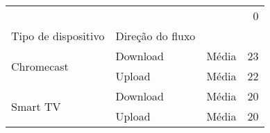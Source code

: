 \begin{tabular}{lllr}
\toprule
 &  &  & 0 \\
Tipo de dispositivo & Direção do fluxo &  &  \\
\midrule
\multirow[t]{2}{*}{Chromecast} & Download & Média & 23 \\
\cline{2-4}
 & Upload & Média & 22 \\
\cline{1-4} \cline{2-4}
\multirow[t]{2}{*}{Smart TV} & Download & Média & 20 \\
\cline{2-4}
 & Upload & Média & 20 \\
\cline{1-4} \cline{2-4}
\bottomrule
\end{tabular}
